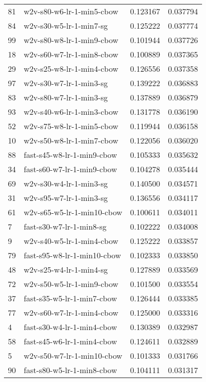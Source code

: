 \begin{tabular}{llrr}
81 &    w2v-s80-w6-lr-1-min5-cbow &  0.123167 &  0.037794 \\
84 &      w2v-s30-w5-lr-1-min7-sg &  0.125222 &  0.037774 \\
99 &    w2v-s80-w8-lr-1-min9-cbow &  0.101944 &  0.037726 \\
18 &    w2v-s60-w7-lr-1-min8-cbow &  0.100889 &  0.037365 \\
29 &    w2v-s25-w8-lr-1-min4-cbow &  0.126556 &  0.037358 \\
97 &      w2v-s30-w7-lr-1-min3-sg &  0.139222 &  0.036883 \\
83 &      w2v-s80-w7-lr-1-min3-sg &  0.137889 &  0.036879 \\
93 &    w2v-s40-w6-lr-1-min3-cbow &  0.131778 &  0.036190 \\
52 &    w2v-s75-w8-lr-1-min5-cbow &  0.119944 &  0.036158 \\
10 &    w2v-s50-w8-lr-1-min7-cbow &  0.122056 &  0.036020 \\
88 &   fast-s45-w8-lr-1-min9-cbow &  0.105333 &  0.035632 \\
34 &   fast-s60-w7-lr-1-min9-cbow &  0.104278 &  0.035444 \\
69 &      w2v-s30-w4-lr-1-min3-sg &  0.140500 &  0.034571 \\
31 &      w2v-s95-w7-lr-1-min3-sg &  0.136556 &  0.034117 \\
61 &   w2v-s65-w5-lr-1-min10-cbow &  0.100611 &  0.034011 \\
7  &     fast-s30-w7-lr-1-min8-sg &  0.102222 &  0.034008 \\
9  &    w2v-s40-w5-lr-1-min4-cbow &  0.125222 &  0.033857 \\
79 &  fast-s95-w8-lr-1-min10-cbow &  0.102333 &  0.033850 \\
48 &      w2v-s25-w4-lr-1-min4-sg &  0.127889 &  0.033569 \\
72 &    w2v-s50-w5-lr-1-min9-cbow &  0.101500 &  0.033554 \\
37 &   fast-s35-w5-lr-1-min7-cbow &  0.126444 &  0.033385 \\
77 &    w2v-s60-w7-lr-1-min4-cbow &  0.125000 &  0.033316 \\
4  &   fast-s30-w4-lr-1-min4-cbow &  0.130389 &  0.032987 \\
58 &   fast-s45-w6-lr-1-min4-cbow &  0.124611 &  0.032889 \\
5  &   w2v-s50-w7-lr-1-min10-cbow &  0.101333 &  0.031766 \\
90 &   fast-s80-w5-lr-1-min8-cbow &  0.104111 &  0.031317 \\

\end{tabular}
